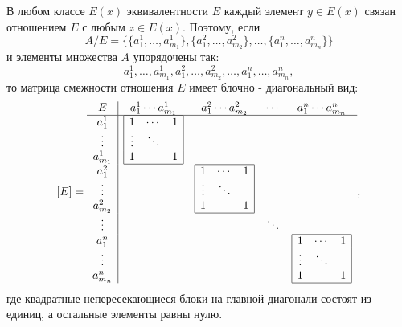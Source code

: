 В любом классе $E(x)$ эквивалентности $E$ каждый элемент $y\in E(x)$ связан отношением $E$ с любым $z\in E(x)$. Поэтому, если 
\[
    A/E=\{\{a^1_1,\ldots,a^1_{m_1}\},\{a^2_1,\ldots,a^2_{m_2}\},\ldots,\{a^n_1,\ldots,a^n_{m_n}\}\}
\]
и элементы множества $A$ упорядочены так:
\[
    a^1_1,\ldots,a^1_{m_1},a^2_1,\ldots,a^2_{m_2},\ldots,a^n_1,\ldots,a^n_{m_n},
\]
то матрица смежности отношения $E$ имеет блочно - диагональный вид:
\[[E]=
    \begin{array}{c|cccc}
        E
            &a^1_1\cdots a^1_{m_1} 
                & a^2_1\cdots a^2_{m_2} 
                    & \cdots 
                        & a^n_1\cdots a^n_{m_n}
                            \\ 
        \hline
        \begin{matrix}a^1_1\\ \vdots \\ a^1_{m_1}\end{matrix} 
            &\begin{array}{|ccc|}\hline 1&\cdots&1\\ \vdots & \ddots & \\ 1 & & 1\\ \hline\end{array}
                &
                    &
                        &
                            \\
        \begin{matrix}a^2_1\\ \vdots \\ a^2_{m_2}\end{matrix} 
            &
                &\begin{array}{|ccc|}\hline 1&\cdots&1\\ \vdots & \ddots & \\ 1 & & 1\\ \hline\end{array}
                    &
                        & 
                            \\
        \vdots
            &
                &
                    &\ddots
                        & 
                            \\
        \begin{matrix}a^n_1\\ \vdots \\ a^n_{m_n}\end{matrix} 
            &
                &
                    &
                        &\begin{array}{|ccc|}\hline 1&\cdots&1\\ \vdots & \ddots & \\ 1 & & 1\\ \hline\end{array}
    \end{array},
\]
где квадратные непересекающиеся блоки на главной диагонали состоят из единиц, а остальные элементы равны нулю.

